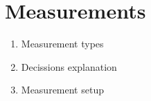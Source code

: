 \section{Measurements}

\begin{enumerate}
  \item Measurement types
  \item Decissions
  \subitem explanation
  \item Measurement setup
\end{enumerate}